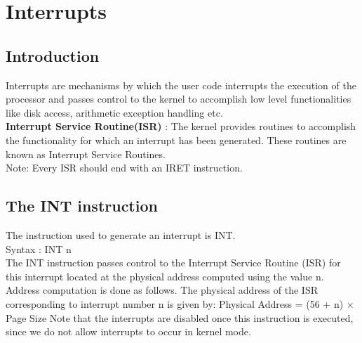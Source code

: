 \documentclass[11pt]{article}
\begin{document}
\section{Interrupts}

\subsection{Introduction}
Interrupts are mechanisms by which the user code interrupts the execution of the processor and passes control to the kernel to accomplish low level functionalities like disk access, arithmetic exception handling etc.\\
\textbf{Interrupt Service Routine(ISR)} : The kernel provides routines to accomplish the functionality for which an interrupt has been generated. These routines are known as Interrupt Service Routines.\\
Note: Every ISR should end with an IRET instruction.

\subsection{The INT instruction}
The instruction used to generate an interrupt is INT.\\
Syntax : INT n\\
The INT instruction passes control to the Interrupt Service Routine (ISR) for this interrupt located at the physical address computed using the value n.
Address computation is done as follows. The physical address of the ISR corresponding to interrupt number n is given by:
Physical Address = (56 + n) × Page Size
Note that the interrupts are disabled once this instruction is executed, since we do not allow interrupts to occur in kernel mode.
\end{document}
